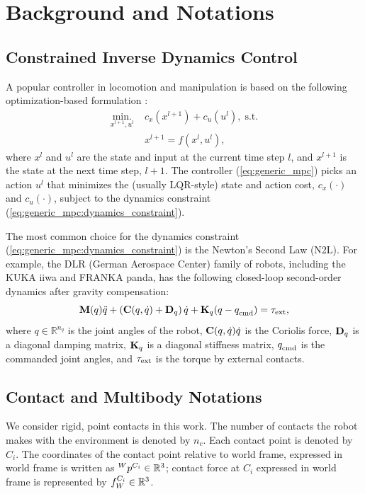 \section{Background and Notations}
\subsection{Constrained Inverse Dynamics Control}
A popular controller in locomotion and manipulation is based on the following optimization-based formulation \cite{kuindersma2014efficiently, koolen2016design, wang2019impact}:
\begin{subequations}
\label{eq:generic_mpc}
\begin{align}
\underset{x^{l+1}, u^l}{\text{min.}} \; &c_x(x^{l+1}) + c_u(u^l), \; \text{s.t.}\\
&x^{l+1} = f(x^{l}, u^l), \label{eq:generic_mpc:dynamics_constraint}
\end{align}
\end{subequations}
where $x^{l}$ and $u^{l}$ are the state and input at the current time step $l$, and $x^{l+1}$ is the state at the next time step, $l+1$. The controller (\ref{eq:generic_mpc}) picks an action $u^l$ that minimizes the (usually LQR-style) state and action cost, $c_x(\cdot)$ and $c_u(\cdot)$, subject to the dynamics constraint (\ref{eq:generic_mpc:dynamics_constraint}).

The most common choice for the dynamics constraint (\ref{eq:generic_mpc:dynamics_constraint}) is the Newton's Second Law (N2L). For example, the DLR (German Aerospace Center) family of robots, including the KUKA iiwa and FRANKA panda, has the following closed-loop second-order dynamics after gravity compensation\cite{ott2008passivity}: 
\begin{equation}
\label{eq:iiwa_second_order_closed_loop_dynamics}
\mb{M}(q) \ddot{q} + \left(\mb{C}(q, \dot{q}) + \mb{D}_q\right) \dot{q} + \mb{K}_q(q - \qcmd) = \tauE,
\end{equation}
where $q \in \mathbb{R}^{n_q}$ is the joint angles of the robot, $\mb{C}(q, \dot{q}) \dot{q}$ is the Coriolis force, $\mb{D}_q$ is a diagonal damping matrix, $\mb{K}_q$ is a diagonal stiffness matrix, $\qcmd$ is the commanded joint angles, and $\tauE$ is the torque by external contacts.

\subsection{Contact and Multibody Notations}
We consider rigid, point contacts in this work. The number of contacts the robot makes with the environment is denoted by $n_c$. Each contact point is denoted by $C_i$. The coordinates of the contact point relative to world frame, expressed in world frame is written as $\quantity{p}{W}{C_i}{} \in \mathbb{R}^3$; contact force at $C_i$ expressed in world frame is represented by $\quantity{f}{}{C_i}{W} \in \mathbb{R}^3$. 

